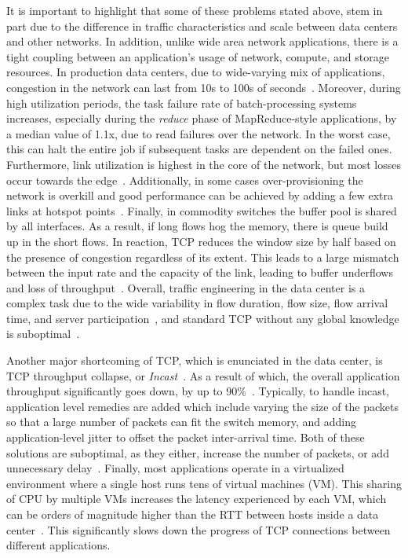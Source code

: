 \documentclass[a4paper,12pt,twoside,openright]{report}
\begin{document}
It is important to highlight that some of these problems stated above, stem in
part due to the difference in traffic characteristics and scale between data
centers and other networks. In addition, unlike wide area network applications,
there is a tight coupling between an application's usage of network, compute,
and storage resources. In production data centers, due to wide-varying mix of
applications, congestion in the network can last from 10s to 100s of
seconds~\cite{Kandula:2009:NDC}. Moreover, during high utilization periods, the
task failure rate of batch-processing systems increases, especially during the
\emph{reduce} phase of MapReduce-style applications, by a median value of 1.1x,
due to read failures over the network. In the worst case, this can halt the
entire job if subsequent tasks are dependent on the failed ones. Furthermore,
link utilization is highest in the core of the network, but most losses occur
towards the edge~\cite{Benson:2010:NTC}. Additionally, in some cases
over-provisioning the network is overkill and good performance can be achieved
by adding a few extra links at hotspot points~\cite{Kandula:2009:FTD}. Finally,
in commodity switches the buffer pool is shared by all interfaces. As a result,
if long flows hog the memory, there is queue build up in the short flows.
In reaction, TCP reduces the window size by half based on the presence of
congestion regardless of its extent. This leads to a large mismatch between the
input rate and the capacity of the link, leading to buffer underflows and loss
of throughput~\cite{Alizadeh:2010:DCT}. Overall, traffic engineering in the data
center is a complex task due to the wide variability in flow duration, flow
size, flow arrival time, and server participation~\cite{Kandula:2009:NDC}, and
standard TCP without any global knowledge is suboptimal~\cite{Benson:2010:CFT}.

Another major shortcoming of TCP, which is enunciated in the data center, is TCP
throughput collapse, or
\emph{Incast}~\cite{Chen:2009:UTI,Vasudevan:2009:SEF,Wu:2010:IIC,Alizadeh:2010:DCT}.
As a result of which, the overall application throughput significantly goes
down, by up to 90\%~\cite{Vasudevan:2009:SEF}. Typically, to handle incast,
application level remedies are added which include varying the size of the
packets so that a large number of packets can fit the switch memory, and adding
application-level jitter to offset the packet inter-arrival time. Both of these
solutions are suboptimal, as they either, increase the number of packets, or add
unnecessary delay~\cite{Alizadeh:2010:DCT}. Finally, most applications operate
in a virtualized environment where a single host runs tens of virtual machines
(VM). This sharing of CPU by multiple VMs increases the latency experienced by
each VM, which can be orders of magnitude higher than the RTT between hosts
inside a data center~\cite{Gamage:2011:OFI,Kangarlou:2010:VIT}. This
significantly slows down the progress of TCP connections between different
applications.
\end{document}
